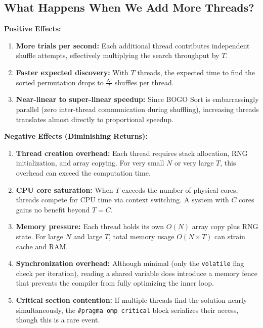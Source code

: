 \documentclass[11pt]{article}
\begin{document}
\subsection{What Happens When We Add More Threads?}

\begin{shadedbox}

\textbf{Positive Effects:}
\begin{enumerate}
    \item \textbf{More trials per second:} Each additional thread contributes independent shuffle attempts, effectively multiplying the search throughput by $T$.
    \item \textbf{Faster expected discovery:} With $T$ threads, the expected time to find the sorted permutation drops to $\frac{N!}{T}$ shuffles per thread.
    \item \textbf{Near-linear to super-linear speedup:} Since BOGO Sort is embarrassingly parallel (zero inter-thread communication during shuffling), increasing threads translates almost directly to proportional speedup.
\end{enumerate}

\vspace{6pt}
\textbf{Negative Effects (Diminishing Returns):}
\begin{enumerate}
    \item \textbf{Thread creation overhead:} Each thread requires stack allocation, RNG initialization, and array copying. For very small $N$ or very large $T$, this overhead can exceed the computation time.
    \item \textbf{CPU core saturation:} When $T$ exceeds the number of physical cores, threads compete for CPU time via context switching. A system with $C$ cores gains no benefit beyond $T = C$.
    \item \textbf{Memory pressure:} Each thread holds its own $O(N)$ array copy plus RNG state. For large $N$ and large $T$, total memory usage $O(N \times T)$ can strain cache and RAM.
    \item \textbf{Synchronization overhead:} Although minimal (only the \texttt{volatile} flag check per iteration), reading a shared variable does introduce a memory fence that prevents the compiler from fully optimizing the inner loop.
    \item \textbf{Critical section contention:} If multiple threads find the solution nearly simultaneously, the \texttt{\#pragma omp critical} block serializes their access, though this is a rare event.
\end{enumerate}
\end{shadedbox}
\end{document}

